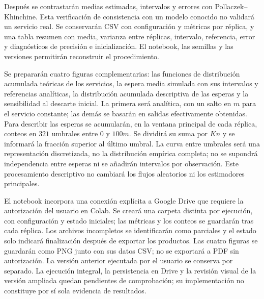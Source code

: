 Después se contrastarán medias estimadas, intervalos y errores con Pollaczek--Khinchine. Esta verificación de consistencia con un modelo conocido no validará un servicio real. Se conservarán CSV con configuración y métricas por réplica, y una tabla resumen con media, varianza entre réplicas, intervalo, referencia, error y diagnósticos de precisión e inicialización. El notebook, las semillas y las versiones permitirán reconstruir el procedimiento.

Se prepararán cuatro figuras complementarias: las funciones de distribución acumulada teóricas de los servicios, la espera media simulada con sus intervalos y referencias analíticas, la distribución acumulada descriptiva de las esperas y la sensibilidad al descarte inicial. La primera será analítica, con un salto en $m$ para el servicio constante; las demás se basarán en salidas efectivamente obtenidas. Para describir las esperas se acumularán, en la ventana principal de cada réplica, conteos en $321$ umbrales entre $0$ y $100m$. Se dividirá su suma por $Kn$ y se informará la fracción superior al último umbral. La curva entre umbrales será una representación discretizada, no la distribución empírica completa; no se supondrá independencia entre esperas ni se añadirán intervalos por observación. Este procesamiento descriptivo no cambiará los flujos aleatorios ni los estimadores principales.

El notebook incorpora una conexión explícita a Google Drive que requiere la autorización del usuario en Colab. Se creará una carpeta distinta por ejecución, con configuración y estado iniciales; las métricas y los conteos se guardarán tras cada réplica. Los archivos incompletos se identificarán como parciales y el estado solo indicará finalización después de exportar los productos. Las cuatro figuras se guardarán como PNG junto con sus datos CSV; no se exportará a PDF sin autorización. La versión anterior ejecutada por el usuario se conserva por separado. La ejecución integral, la persistencia en Drive y la revisión visual de la versión ampliada quedan pendientes de comprobación; su implementación no constituye por sí sola evidencia de resultados.
